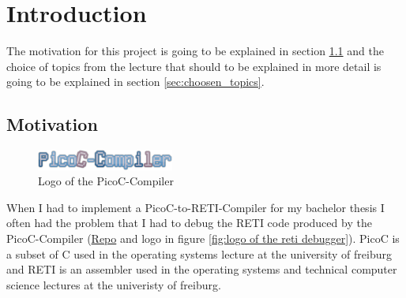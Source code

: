 \documentclass{report}
\begin{document}
\fontsize{9pt}{11pt}\selectfont




\tableofcontents
\thispagestyle{empty}
\clearpage
\pagestyle{plain}

\listoffigures
\newpage
\listoftables

\clearpage
{}
\pagestyle{default}

\chapter{Introduction}
\label{sec:introduction}

The motivation for this project is going to be explained in section \ref{sec:motivation} and the choice of topics from the lecture that should to be explained in more detail is going to be explained in section \ref{sec:choosen_topics}.

\section{Motivation}
\label{sec:motivation}

\begin{figure}
	\centering
	\includegraphics[width=0.4\textwidth]{./figures/picoc_compiler.png}
	\caption{Logo of the PicoC-Compiler}
	\label{fig:logo of the picoc compiler}
\end{figure}

When I had to implement a PicoC-to-RETI-Compiler for my bachelor thesis I often had the problem that I had to debug the RETI code produced by the \alert{PicoC-Compiler} (\href{https://github.com/matthejue/PicoC-Compiler/tree/missing_semester_project}{Repo} and logo in figure \ref{fig:logo of the reti debugger}). \alert{PicoC} is a subset of C used in the operating systems lecture at the university of freiburg and \alert{RETI} is an assembler used in the operating systems and technical computer science lectures at the univeristy of freiburg.
\end{document}
